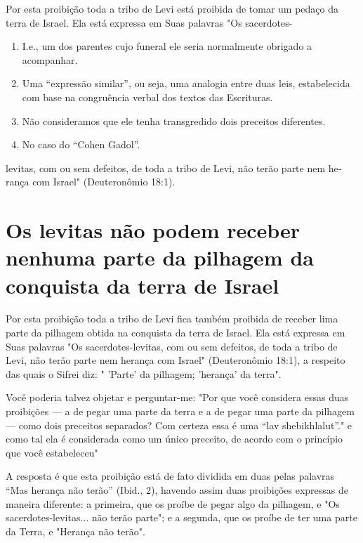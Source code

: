 Por esta proibição toda a tribo de Levi está proibida de tomar um pedaço
da terra de Israel. Ela está expressa em Suas palavras "Os sacerdotes-


\begin{enumerate}
\def\labelenumi{\arabic{enumi}.}
\setcounter{enumi}{335}
\item
 
 I.e., um dos parentes cujo funeral ele seria normalmente obrigado a
 acompanhar.
 
\item
 
 Uma ``expressão similar'', ou seja, uma analogia entre duas leis,
 estabelecida com base na con­gruência verbal dos textos das
 Escrituras.
 
\item
 
 Não consideramos que ele tenha transgredido dois preceitos diferentes.
 
\item
 
 No caso do ``Cohen Gadol''.
 
\end{enumerate}

levitas, com ou sem defeitos, de toda a tribo de Levi, não terão parte
nem he­rança com Israel" (Deuteronômio 18:1).

\section{Os levitas não podem receber nenhuma parte da pilhagem da conquista
da terra de Israel}

Por esta proibição toda a tribo de Levi fica também proibida de re­ceber
lima parte da pilhagem obtida na conquista da terra de Israel. Ela está
expressa em Suas palavras "Os sacerdotes-levitas, com ou sem defeitos,
de to­da a tribo de Levi, não terão parte nem herança com Israel"
(Deuteronômio 18:1), a respeito das quais o Sifrei diz: " 'Parte' da
pilhagem; 'herança' da terra".

Você poderia talvez objetar e perguntar-me: "Por que você conside­ra
essas duas proibições --- a de pegar uma parte da terra e a de pegar uma
parte da pilhagem --- como dois preceitos separados? Com certeza essa é
uma ``lav shebikhlalut''." e como tal ela é considerada
como um único preceito, de acordo com o princípio que você estabeleceu"

A resposta é que esta proibição está de fato dividida em duas pelas
palavras ``Mas herança não terão'' (Ibid., 2), havendo assim duas
proibições ex­pressas de maneira diferente: a primeira, que os proíbe de
pegar algo da pilha­gem, e "Os sacerdotes-levitas... não terão parte"; e
a segunda, que os proíbe de ter uma parte da Terra, e "Herança não
terão".

